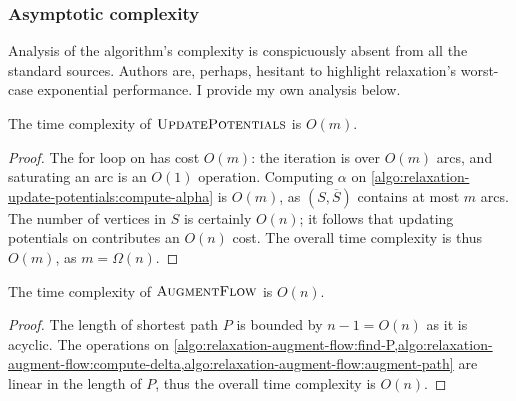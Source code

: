\subsubsection{Asymptotic complexity}

Analysis of the algorithm's complexity is conspicuously absent from all the standard sources. Authors are, perhaps, hesitant to highlight relaxation's worst-case exponential performance. I provide my own analysis below. \\

\begin{lemma} \label{lemma:relax-complexity-updatepotentials}
The time complexity of $\textproc{UpdatePotentials}$ is $O(m)$.
\end{lemma}
\begin{proof}
The for loop on  has cost $O(m)$: the iteration is over $O(m)$ arcs, and saturating an arc is an $O(1)$ operation. Computing $\alpha$ on \cref{algo:relaxation-update-potentials:compute-alpha} is $O(m)$, as $\left(S,\overline{S}\right)$ contains at most $m$ arcs. The number of vertices in $S$ is certainly $O(n)$; it follows that updating potentials on  contributes an $O(n)$ cost. The overall time complexity is thus $O(m)$, as $m = \Omega(n)$.
\end{proof}

\begin{lemma} \label{lemma:relax-complexity-augmentflow}
The time complexity of $\textproc{AugmentFlow}$ is $O(n)$.
\end{lemma}
\begin{proof}
The length of shortest path $P$ is bounded by $n-1=O(n)$ as it is acyclic. The operations on \cref{algo:relaxation-augment-flow:find-P,algo:relaxation-augment-flow:compute-delta,algo:relaxation-augment-flow:augment-path} are linear in the length of $P$, thus the overall time complexity is $O(n)$.
\end{proof}

